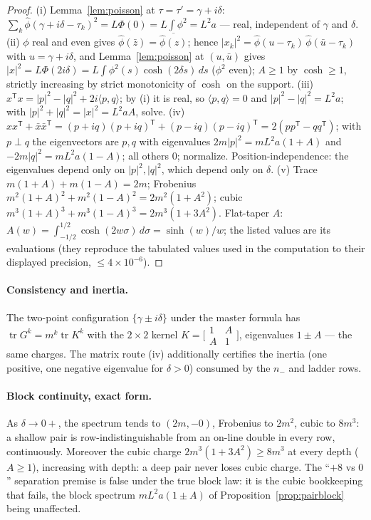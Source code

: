 \documentclass[11pt]{article}
\theoremstyle{plain}
\theoremstyle{definition}
\theoremstyle{remark}
\newcommand{\tr}{\operatorname{tr}}
\newcommand{\ph}{\widehat{\phi}}
\begin{document}
\begin{proof}
(i) Lemma~\ref{lem:poisson} at $\tau = \tau' = \gamma + i\delta$:
$\sum_k \ph(\gamma + i\delta - \tau_k)^2 = L\Phi(0) = L \int \phi^2 = L^2 a$ ---
real, independent of $\gamma$ and $\delta$.
(ii) $\phi$ real and even gives $\ph(\bar{z}) = \overline{\ph(z)}$; hence
$|x_k|^2 = \ph(u - \tau_k)\, \ph(\bar{u} - \tau_k)$ with $u = \gamma + i\delta$,
and Lemma~\ref{lem:poisson} at $(u, \bar{u})$ gives
$|x|^2 = L\Phi(2i\delta) = L \int \phi^2(s)\cosh(2\delta s)\, ds$ ($\phi^2$
even); $A \ge 1$ by $\cosh \ge 1$, strictly increasing by strict monotonicity of
$\cosh$ on the support.
(iii) $x^{\mathsf{T}} x = |p|^2 - |q|^2 + 2i\langle p, q\rangle$; by (i) it is
real, so $\langle p, q \rangle = 0$ and $|p|^2 - |q|^2 = L^2 a$; with
$|p|^2 + |q|^2 = |x|^2 = L^2 a A$, solve.
(iv) $x x^{\mathsf{T}} + \bar{x}\bar{x}^{\mathsf{T}}
 = (p + iq)(p + iq)^{\mathsf{T}} + (p - iq)(p - iq)^{\mathsf{T}}
 = 2(p p^{\mathsf{T}} - q q^{\mathsf{T}})$; with $p \perp q$ the eigenvectors are
$p, q$ with eigenvalues $2m|p|^2 = m L^2 a (1 + A)$ and
$-2m|q|^2 = m L^2 a (1 - A)$; all others $0$; normalize. Position-independence:
the eigenvalues depend only on $|p|^2, |q|^2$, which depend only on $\delta$.
(v) Trace $m(1 + A) + m(1 - A) = 2m$; Frobenius
$m^2(1 + A)^2 + m^2(1 - A)^2 = 2m^2(1 + A^2)$; cubic
$m^3(1 + A)^3 + m^3(1 - A)^3 = 2m^3(1 + 3A^2)$. Flat-taper $A$:
$A(w) = \int_{-1/2}^{1/2} \cosh(2w\sigma)\, d\sigma = \sinh(w)/w$; the listed
values are its evaluations (they reproduce the tabulated values used in the
computation to their displayed precision, $\le 4 \times 10^{-6}$).
\end{proof}

\paragraph{Consistency and inertia.}
The two-point configuration $\{\gamma \pm i\delta\}$ under the master formula has
$\tr G^k = m^k \tr K^k$ with the $2 \times 2$ kernel
$K = \bigl[\begin{smallmatrix} 1 & A \\ A & 1 \end{smallmatrix}\bigr]$,
eigenvalues $1 \pm A$ --- the same charges. The matrix route (iv) additionally
certifies the inertia (one positive, one negative eigenvalue for $\delta > 0$)
consumed by the $n_-$ and ladder rows.

\paragraph{Block continuity, exact form.}
As $\delta \to 0+$, the spectrum tends to $(2m, -0)$, Frobenius to $2m^2$, cubic
to $8m^3$: a shallow pair is row-indistinguishable from an on-line double in
every row, continuously. Moreover the cubic charge $2m^3(1 + 3A^2) \ge 8m^3$ at
every depth ($A \ge 1$), increasing with depth: a deep pair never loses cubic
charge. The ``$+8$ vs $0$'' separation premise is false under the true block
law: it is the cubic bookkeeping that fails, the block spectrum
$m L^2 a (1 \pm A)$ of Proposition~\ref{prop:pairblock} being unaffected.
\end{document}
